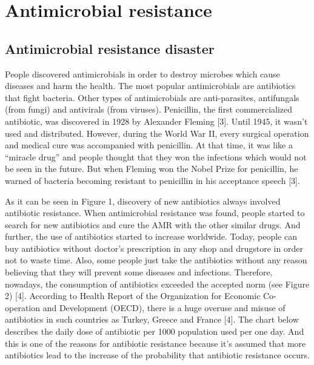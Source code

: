 \chapter{Antimicrobial resistance}

\section{Antimicrobial resistance disaster}

People discovered antimicrobials in order to destroy microbes which cause diseases and harm the health. The most popular antimicrobials are antibiotics that fight bacteria. Other types of antimicrobials are anti-parasites, antifungals (from fungi) and antivirals (from viruses). Penicillin, the first commercialized antibiotic, was discovered in 1928 by Alexander Fleming [3].  Until 1945, it wasn’t used and distributed. However, during the World War II, every surgical operation and medical cure was accompanied with penicillin. At that time, it was like a “miracle drug” and people thought that they won the infections which would not be seen in the future.  But when Fleming won the Nobel Prize for penicillin, he warned of bacteria becoming resistant to penicillin in his acceptance speech [3].

As it can be seen in Figure 1, discovery of new antibiotics always involved antibiotic resistance. When antimicrobial resistance was found, people started to search for new antibiotics and cure the AMR with the other similar drugs. And further, the use of antibiotics started to increase worldwide. Today, people can buy antibiotics without doctor’s prescription in any shop and drugstore in order not to waste time. Also, some people just take the antibiotics without any reason believing that they will prevent some diseases and infections. Therefore, nowadays, the consumption of antibiotics exceeded the accepted norm (see Figure 2) [4]. According to Health Report of the Organization for Economic Co-operation and Development (OECD), there is a huge overuse and misuse of antibiotics in such countries as Turkey, Greece and France [4]. The chart below describes the daily dose of antibiotic per 1000 population used per one day. And this is one of the reasons for antibiotic resistance because it’s assumed that more antibiotics lead to the increase of the probability that antibiotic resistance occurs.


